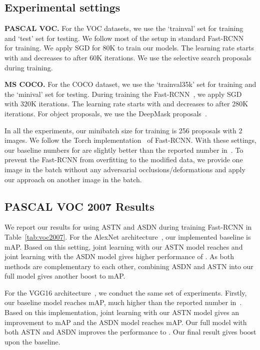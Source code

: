 \documentclass[10pt,twocolumn,letterpaper]{article}
\begin{document}
\subsection{Experimental settings}

\textbf{PASCAL VOC.} For the VOC datasets, we use the `trainval' set for training and `test' set for testing.  We follow most of the setup in standard Fast-RCNN~\cite{frcn} for training. We apply SGD for 80K to train our models. The learning rate starts with  and decreases to  after 60K iterations. We use the selective search proposals~\cite{Uijlings13} during training. 

\textbf{MS COCO.} For the COCO dataset, we use the `trainval35k' set for training and the  `minival' set for testing. During training the Fast-RCNN~\cite{frcn}, we apply SGD with 320K iterations. The learning rate starts with  and decreases to  after 280K iterations. For object proposals, we use the DeepMask proposals~\cite{DeepMask}. 

In all the experiments, our minibatch size for training is 256 proposals with 2 images. We follow the Torch implementation~\cite{Zagoruyko2016Multipath} of Fast-RCNN. With these settings, our baseline numbers for are slightly better than the reported number in~\cite{frcn}. To prevent the Fast-RCNN from overfitting to the modified data, we provide one image in the batch without any adversarial occlusions/deformations and apply our approach on another image in the batch. 


\subsection{PASCAL VOC 2007 Results}
\vspace{-0.05in}
We report our results for using ASTN and ASDN during training Fast-RCNN in Table~\ref{tab:voc2007}. For the AlexNet architecture~\cite{alex}, our implemented baseline is  mAP. Based on this setting, joint learning with our ASTN model reaches  and joint learning with the ASDN model gives higher performance of . As both methods are complementary to each other, combining ASDN and ASTN into our full model gives another boost to  mAP. 

For the VGG16 architecture~\cite{VGG}, we conduct the same set of experiments. Firstly, our baseline model reaches  mAP, much higher than the reported number  in~\cite{frcn}. Based on this implementation, joint learning with our ASTN model gives an improvement to  mAP and the ASDN model reaches  mAP. Our full model with both ASTN and ASDN improves the performance to . Our final result gives   boost upon the baseline. 
\end{document}

